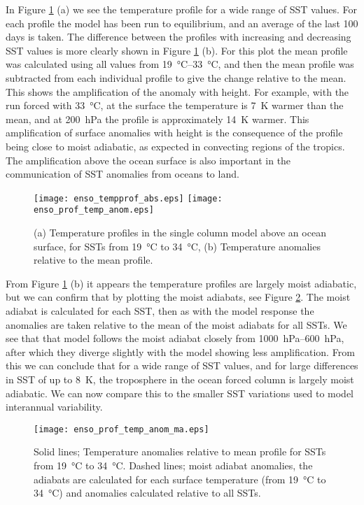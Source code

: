 In Figure \ref{fig:scmsstprof_large} (a) we see the temperature profile for a 
wide range of SST values. For each profile the model has been run to 
equilibrium, and an average of the last 100 days is taken. The difference 
between the profiles with increasing and decreasing SST values is more clearly 
shown in Figure \ref{fig:scmsstprof_large} (b). For this plot the mean profile 
was calculated using all values from \SIrange{19}{33}{\degreeCelsius}, and then 
the mean profile was subtracted from each individual profile to give the change 
relative to the mean. This shows the amplification of the anomaly with height.  
For example, with the run forced with \SI{33}{\degreeCelsius}, at the surface 
the temperature is \SI{7}{\kelvin} warmer than the mean, and at 
\SI{200}{\hecto\pascal} the profile is approximately \SI{14}{\kelvin} warmer.  
This amplification of surface anomalies with height is the consequence of the 
profile being close to moist adiabatic, as expected in convecting regions of the 
tropics. The amplification above the ocean surface is also important in the 
communication of SST anomalies from oceans to land. 

\begin{figure}[ht]
\texttt{[image: enso\_tempprof\_abs.eps]}
\texttt{[image: enso\_prof\_temp\_anom.eps]}
\caption{(a) Temperature profiles in the single column model above an ocean 
	surface, for SSTs from \SI{19}{\degreeCelsius} to \SI{34}{\degreeCelsius}, 
(b) Temperature anomalies relative to the mean profile.}
\label{fig:scmsstprof_large}
\end{figure}

From Figure \ref{fig:scmsstprof_large} (b) it appears the temperature profiles 
are largely moist adiabatic, but we can confirm that by plotting the moist 
adiabats, see Figure \ref{fig:scmsstprof_ma}. The moist adiabat is calculated 
for each SST, then as with the model response the anomalies are taken relative 
to the mean of the moist adiabats for all SSTs. We see that that model follows 
the moist adiabat closely from \SIrange{1000}{600}{\hecto\pascal}, after which 
they diverge slightly with the model showing less amplification. From this we 
can conclude that for a wide range of SST values, and for large differences in 
SST of up to \SI{8}{\kelvin}, the troposphere in the ocean forced column is 
largely moist adiabatic.  We can now compare this to the smaller SST variations 
used to model interannual variability.

\begin{figure}[ht]
\texttt{[image: enso\_prof\_temp\_anom\_ma.eps]}
\caption{Solid lines; Temperature anomalies relative to mean profile for SSTs 
from \SI{19}{\degreeCelsius} to \SI{34}{\degreeCelsius}. Dashed lines; moist 
adiabat anomalies, the adiabats are calculated for each surface temperature 
(from \SI{19}{\degreeCelsius} to \SI{34}{\degreeCelsius}) and anomalies 
calculated relative to all SSTs.}
\label{fig:scmsstprof_ma}
\end{figure}

